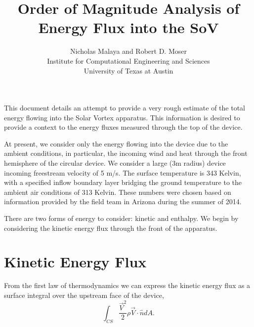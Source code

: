 \documentclass{article}
\title{\bf{Order of Magnitude Analysis of Energy Flux into the SoV}}
\author{Nicholas Malaya and Robert D. Moser\\ Institute for Computational Engineering and Sciences \\ University of Texas at Austin} \date{}
\begin{document}
\maketitle

This document details an attempt to provide a very rough estimate of the
total energy flowing into the Solar Vortex apparatus. This information
is desired to provide a context to the energy fluxes measured through
the top of the device. 

At present, we consider only the energy flowing into the device due to
the ambient conditions, in particular, the incoming wind and heat
through the front hemisphere of the circular device. We consider a large
(3m radius) device incoming freestream velocity of 5 m/s. The surface
temperature is 343 Kelvin, with a specified inflow boundary layer
bridging the ground temperature to the ambient air conditions of 313
Kelvin. These numbers were chosen based on information provided by the
field team in Arizona during the summer of 2014. 

There are two forms of energy to consider: kinetic and enthalpy. We
begin by considering the kinetic energy flux through the front of the
apparatus. 

\section*{Kinetic Energy Flux}

From the first law of thermodynamics we can express the kinetic energy
flux as a surface integral over the upstream face of the device, 
\begin{equation*}
\int_{CS} \frac{\vec V^2}{2} \rho \vec V \cdot \hat n dA.
\end{equation*}
%
%
\end{document}
